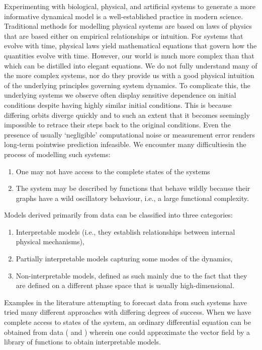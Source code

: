 \documentclass[a4paper,12pt,twoside]{report}
\begin{document}
Experimenting with biological, physical, and artificial systems to generate a more informative dynamical model is a well-established practice in modern science. Traditional methods for modelling physical systems are based on laws of physics that are based either on empirical relationships or intuition. For systems that evolve with time, physical laws yield mathematical equations that govern how the quantities evolve with time. However, our world is much more complex than that which can be distilled into elegant equations. We do not fully understand many of the more complex systems, nor do they provide us with a good physical intuition of the underlying principles governing system dynamics. To complicate this, the underlying systems we observe often display sensitive dependence on initial conditions despite having highly similar initial conditions. This is because differing orbits diverge quickly and to such an extent that it becomes seemingly impossible to retrace their steps back to the original conditions. Even the presence of usually `negligible' computational noise or measurement error renders long-term pointwise prediction infeasible. We encounter many difficultiesin the process of modelling such systems:
\vspace{-8mm}
\begin{enumerate}[noitemsep, label=\roman*.]
  \item One may not have access to the complete states of the systems
  \item The system may be described by functions that behave wildly because their graphs have a wild oscillatory behaviour, i.e., a large functional complexity.
\end{enumerate}


Models derived primarily from data can be classified into three categories: 
\vspace{-8mm}
\begin{enumerate}[noitemsep, label=\roman*.]
  \item  Interpretable models (i.e., they establish relationships between internal physical mechanisms), 
  \item Partially interpretable models capturing some modes of the dynamics, 
  \item Non-interpretable models, defined as such mainly due to the fact that they are defined on a different phase space that is usually high-dimensional. 
\end{enumerate}

Examples in the literature attempting to forecast data from such systems have tried many different approaches with differing degrees of success. 
When we have complete access to states of the system, an ordinary differential equation can be obtained from data (\cite{brunton2016discovering, champion2019data} and \cite{small2002modeling,xu2006modeling}) wherein one could approximate the vector field by a library of functions to obtain interpretable models. 
\end{document}
